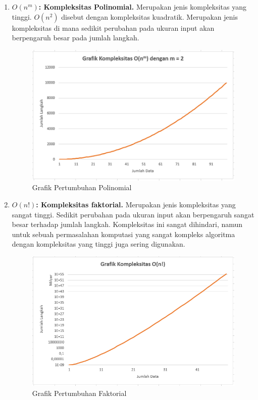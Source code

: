 \begin{enumerate}
    \FloatBarrier

    \item \textbf{$O (n^m)$: Kompleksitas Polinomial.} Merupakan jenis kompleksitas yang tinggi. $O (n^2)$ disebut dengan kompleksitas kuadratik. Merupakan jenis kompleksitas di mana sedikit perubahan pada ukuran input akan berpengaruh besar pada jumlah langkah.

    \begin{figure}
        \centering
        \includegraphics[width=\textwidth]{fig/ExponentialGrowth}
        \caption{Grafik Pertumbuhan Polinomial}
        \label{fig:ExponentialGrowth}
    \end{figure}

    \FloatBarrier

    \item \textbf{$O (n!)$: Kompleksitas faktorial.} Merupakan jenis kompleksitas yang sangat tinggi. Sedikit perubahan pada ukuran input akan berpengaruh sangat besar terhadap jumlah langkah. Kompleksitas ini sangat dihindari, namun untuk sebuah permasalahan komputasi yang sangat kompleks algoritma dengan kompleksitas yang tinggi juga sering digunakan.

    \begin{figure}
        \centering
        \includegraphics[width=\textwidth]{fig/FactorialGrowth}
        \caption{Grafik Pertumbuhan Faktorial}
        \label{fig:FactorialGrowth}
    \end{figure}

    \FloatBarrier
\end{enumerate}

